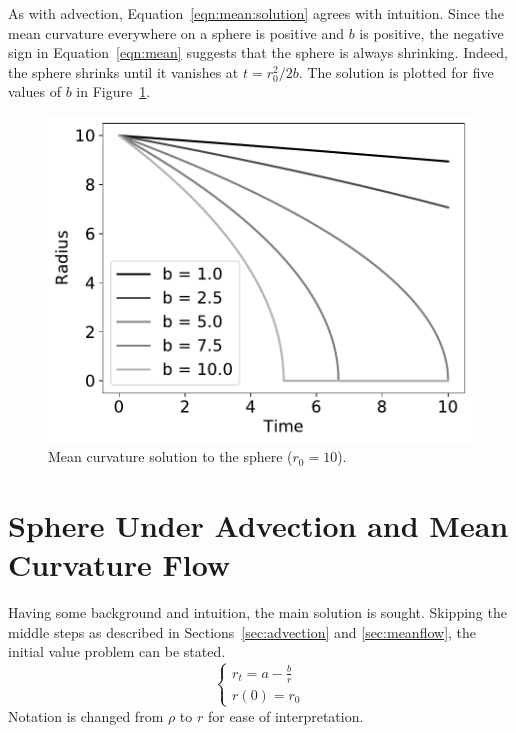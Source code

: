 \documentclass[journal]{IEEEtran}
\begin{document}
As with advection, Equation~\ref{eqn:mean:solution} agrees with intuition.
Since the mean curvature everywhere on a sphere is positive and $b$ is positive, the negative sign in Equation~\ref{eqn:mean} suggests that the sphere is always shrinking.
Indeed, the sphere shrinks until it vanishes at $t = r_0^2/2b$.
The solution is plotted for five values of $b$ in Figure~\ref{fig:mean}.

\begin{figure}[t]
  \centering
    \includegraphics[width=0.9\linewidth]{mean}%
  \caption{Mean curvature solution to the sphere ($r_0 = 10$).}
  \label{fig:mean}
\end{figure}

\section{Sphere Under Advection and Mean Curvature Flow}
Having some background and intuition, the main solution is sought.
Skipping the middle steps as described in Sections~\ref{sec:advection} and \ref{sec:meanflow}, the initial value problem can be stated.
\begin{equation}
  \label{eqn:base}
  \left\{
    \begin{array}{ll}
      r_t = a - \frac{b}{r}\\
      r(0) = r_0
    \end{array}
  \right.
\end{equation}
Notation is changed from $\rho$ to $r$ for ease of interpretation.
\end{document}
